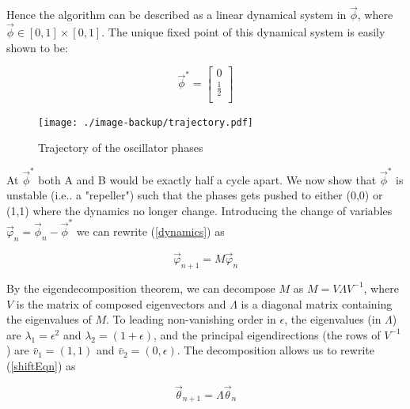 \documentclass{sig-alternate}
\begin{document}
{Hence the algorithm can be described as a
linear dynamical system in $\vec{\phi}$, where $\vec{\phi} \in
[0,1] \times [0, 1]$. The unique fixed point of this dynamical
system is easily shown to be:

\begin{equation}\label{fixedPtDefn}
\vec{\phi}^*=
\begin{bmatrix}
  0 \\
  \frac{1}{2} \\
\end{bmatrix}
\end{equation}

\begin{figure}[t]
\begin{center}
\texttt{[image: ./image-backup/trajectory.pdf]}
\end{center}
\caption{Trajectory of the oscillator phases}
\label{fig:theory1}
\end{figure}

At $\vec{\phi}^*$ both A and B would be exactly half a cycle apart. We
now show that $\vec{\phi}^*$ is unstable (i.e.. a "repeller") such that
the phases gets pushed to either (0,0) or (1,1) where the dynamics no
longer change. Introducing the change of variables
$\vec{\varphi}_n=\vec{\phi}_n-\vec{\phi}^* $ we can rewrite
(\ref{dynamics}) as

\begin{equation}\label{shiftEqn}
    \vec{\varphi}_{n+1}=M\vec{\varphi}_n
\end{equation}

By the eigendecomposition theorem, we can decompose $M$ as
$M=V\Lambda V^{-1}$, where $V$ is the matrix of composed
eigenvectors and $\Lambda$ is a diagonal matrix containing the
eigenvalues of $M$. To leading non-vanishing order in $\epsilon$,
the eigenvalues (in $\Lambda$) are $\lambda_1=\epsilon^2$ and
$\lambda_2=(1+\epsilon)$, and the principal eigendirections (the
rows of $V^{-1}$) are $\bar{v}_1=(1,1)$ and
$\bar{v}_2=(0,\epsilon)$. The decomposition allows us to rewrite
(\ref{shiftEqn}) as

\begin{equation}\label{changeOfBasisEqn}
    \vec{\theta}_{n+1}=\Lambda\vec{\theta}_{n}
\end{equation}

}
\end{document}
